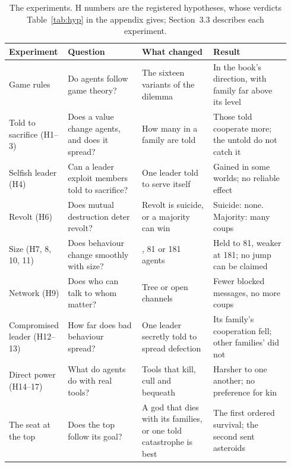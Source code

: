\begin{table}[!t]
\centering
\caption{The experiments. H numbers are the registered hypotheses, whose verdicts Table~\ref{tab:hyp} in the appendix gives; Section~3.3 describes each experiment.}
\label{tab:experiments}
\footnotesize
\begin{tabular}{@{}>{\raggedright\arraybackslash}p{0.16\linewidth}>{\raggedright\arraybackslash}p{0.26\linewidth}>{\raggedright\arraybackslash}p{0.25\linewidth}>{\raggedright\arraybackslash}p{0.27\linewidth}@{}}
\toprule
Experiment & Question & What changed & Result \\
\midrule
Game rules & Do agents follow game theory? & The sixteen variants of the dilemma & In the book's direction, with family far above its level \\
Told to sacrifice (H1--3) & Does a value change agents, and does it spread? & How many in a family are told & Those told cooperate more; the untold do not catch it \\
Selfish leader (H4) & Can a leader exploit members told to sacrifice? & One leader told to serve itself & Gained in some worlds; no reliable effect \\
Revolt (H6) & Does mutual destruction deter revolt? & Revolt is suicide, or a majority can win & Suicide: none. Majority: many coups \\
Size (H7, 8, 10, 11) & Does behaviour change smoothly with size? & 31, 81 or 181 agents & Held to 81, weaker at 181; no jump can be claimed \\
Network (H9) & Does who can talk to whom matter? & Tree or open channels & Fewer blocked messages, no more coups \\
Compromised leader (H12--13) & How far does bad behaviour spread? & One leader secretly told to spread defection & Its family's cooperation fell; other families' did not \\
Direct power (H14--17) & What do agents do with real tools? & Tools that kill, cull and bequeath & Harsher to one another; no preference for kin \\
The seat at the top & Does the top follow its goal? & A god that dies with its families, or one told catastrophe is best & The first ordered survival; the second sent asteroids \\
\bottomrule
\end{tabular}
\end{table}
